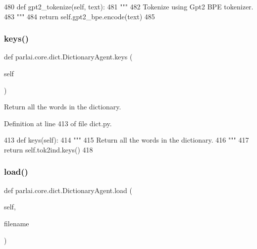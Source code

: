 \begin{DoxyCode}
480     \textcolor{keyword}{def }gpt2\_tokenize(self, text):
481         \textcolor{stringliteral}{"""}
482 \textcolor{stringliteral}{        Tokenize using Gpt2 BPE tokenizer.}
483 \textcolor{stringliteral}{        """}
484         \textcolor{keywordflow}{return} self.gpt2\_bpe.encode(text)
485 
\end{DoxyCode}
\mbox{\label{classparlai_1_1core_1_1dict_1_1DictionaryAgent_ad5abcf174648d88f2383cba7a361dd29}} 
\subsubsection{\texorpdfstring{keys()}{keys()}}
{\footnotesize\ttfamily def parlai.\+core.\+dict.\+Dictionary\+Agent.\+keys (\begin{DoxyParamCaption}\item[{}]{self }\end{DoxyParamCaption})}

\begin{DoxyVerb}Return all the words in the dictionary.
\end{DoxyVerb}
 

Definition at line 413 of file dict.\+py.


\begin{DoxyCode}
413     \textcolor{keyword}{def }keys(self):
414         \textcolor{stringliteral}{"""}
415 \textcolor{stringliteral}{        Return all the words in the dictionary.}
416 \textcolor{stringliteral}{        """}
417         \textcolor{keywordflow}{return} self.tok2ind.keys()
418 
\end{DoxyCode}
\mbox{\label{classparlai_1_1core_1_1dict_1_1DictionaryAgent_aa4229d1ba17932f588e15067afd9bf42}} 
\subsubsection{\texorpdfstring{load()}{load()}}
{\footnotesize\ttfamily def parlai.\+core.\+dict.\+Dictionary\+Agent.\+load (\begin{DoxyParamCaption}\item[{}]{self,  }\item[{}]{filename }\end{DoxyParamCaption})}

